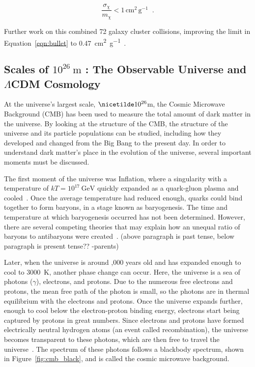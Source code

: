\begin{equation}\label{eqn:bullet}
  \frac{\sigma_{\chi}}{m_{\chi}} < 1 \, \textrm{cm}^2 \, \textrm{g}^{-1} \;\; .
\end{equation}

Further work on this combined 72 galaxy cluster collisions, improving the limit in Equation~\ref{eqn:bullet} to \SI{0.47}{cm^2 g^{-1}}~\cite{cluster_72}.


\subsection{Scales of $10^{26}\:\text{m}$ : The Observable Universe and $\Lambda$CDM Cosmology}\label{dm_universe}
At the universe's largest scale, $\nicetilde 10^{26}$m, the Cosmic Microwave Background (CMB) has been used to measure the total amount of dark matter in the universe.
By looking at the structure of the CMB, the structure of the universe and its particle populations can be studied, including how they developed and changed from the Big Bang to the present day.
In order to understand dark matter's place in the evolution of the universe, several important moments must be discussed.

The first moment of the universe was Inflation, where a singularity with a temperature of $kT=10^{17}\:\textrm{GeV}$ quickly expanded as a quark-gluon plasma and cooled~\cite{inflation0,inflation1,inflation2,inflation3}.
Once the average temperature had reduced enough, quarks could bind together to form baryons, in a stage known as baryogenesis.
The time and temperature at which baryogenesis occurred has not been determined.
However, there are several competing theories that may explain how an unequal ratio of baryons to antibaryons were created~\cite{baryogenesis1,baryogenesis2}.
{\color{red}(above paragraph is past tense, below paragraph is present tense?? -parents)}

Later, when the universe is around ,000 years old and has expanded enough to cool to \nicetilde\SI{3000}{K}, another phase change can occur.
Here, the universe is a sea of photons ($\gamma$), electrons, and protons.
Due to the numerous free electrons and protons, the mean free path of the photon is small, so the photons are in thermal equilibrium with the electrons and protons.
Once the universe expands further, enough to cool below the electron-proton binding energy, electrons start being captured by protons in great numbers.
Since electrons and protons have formed electrically neutral hydrogen atoms (an event called recombination), the universe becomes transparent to these photons, which are then free to travel the universe~\cite{planck2015,theEarlyUniverse,CMBFundamentals,CMBFlat}.
The spectrum of these photons follows a blackbody spectrum, shown in Figure~\ref{fig:cmb_black}, and is called the cosmic microwave background.

